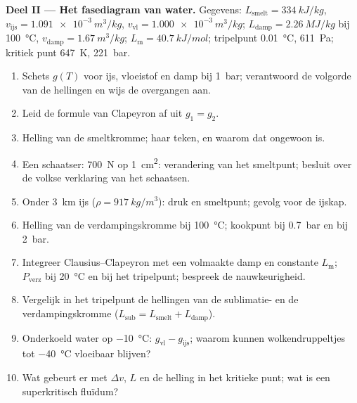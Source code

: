 \begin{problem}
\textbf{Deel II --- Het fasediagram van water.}
Gegevens: $L_{\text{smelt}} = \qty{334}{kJ/kg}$,
$v_{\text{ijs}} = \qty{1.091e-3}{m^3/kg}$,
$v_{\text{vl}} = \qty{1.000e-3}{m^3/kg}$; $L_{\text{damp}} = \qty{2.26}{MJ/kg}$ bij
\qty{100}{\celsius}, $v_{\text{damp}} = \qty{1.67}{m^3/kg}$;
$L_{\text{m}} = \qty{40.7}{kJ/mol}$;
tripelpunt \qty{0.01}{\celsius}, \qty{611}{Pa}; kritiek punt \qty{647}{K},
\qty{221}{bar}.
\begin{enumerate}[resume]
  \item Schets $g(T)$ voor ijs, vloeistof en damp bij \qty{1}{bar}; verantwoord
        de volgorde van de hellingen en wijs de overgangen aan.
  \item Leid de formule van Clapeyron af uit $g_1 = g_2$.
  \item Helling van de smeltkromme; haar teken, en waarom dat ongewoon is.
  \item Een schaatser: \qty{700}{N} op \qty{1}{cm^2}: verandering van het
        smeltpunt; besluit over de volkse verklaring van het schaatsen.
  \item Onder \qty{3}{km} ijs ($\rho = \qty{917}{kg/m^3}$): druk en
        smeltpunt; gevolg voor de ijskap.
  \item Helling van de verdampingskromme bij \qty{100}{\celsius}; kookpunt
        bij \qty{0.7}{bar} en bij \qty{2}{bar}.
  \item Integreer Clausius--Clapeyron met een volmaakte damp en
        constante $L_{\text{m}}$; $P_{\text{verz}}$ bij \qty{20}{\celsius} en bij
        het tripelpunt; bespreek de nauwkeurigheid.
  \item Vergelijk in het tripelpunt de hellingen van de sublimatie- en de
        verdampingskromme ($L_{\text{sub}} = L_{\text{smelt}} + L_{\text{damp}}$).
  \item Onderkoeld water op \qty{-10}{\celsius}: $g_{\text{vl}} - g_{\text{ijs}}$;
        waarom kunnen wolkendruppeltjes tot \qty{-40}{\celsius} vloeibaar blijven?
  \item Wat gebeurt er met $\Delta v$, $L$ en de helling in het kritieke
        punt; wat is een superkritisch fluïdum?
\end{enumerate}


\end{problem}
